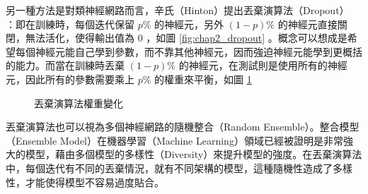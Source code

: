 另一種方法是對類神經網路而言，辛氏（Hinton）提出丟棄演算法（Dropout）~\cite{srivastava2014dropout} ：即在訓練時，每個迭代保留 $p\%$ 的神經元，另外 $(1-p)\%$ 的神經元直接關閉，無法活化，使得輸出值為 0 ，如圖 \ref{fig:chap2_dropout} 。概念可以想成是希望每個神經元能自己學到參數，而不靠其他神經元，因而強迫神經元能學到更概括的能力。而當在訓練時丟棄 $(1-p)\%$ 的神經元，在測試則是使用所有的神經元，因此所有的參數需要乘上 $p\%$ 的權重來平衡，如圖 \ref{fig:chap2_drop_w}

\begin{figure}[h]
    \centering
    \caption{丟棄演算法權重變化\cite{srivastava2014dropout}}\label{fig:chap2_drop_w}
\end{figure}

丟棄演算法也可以視為多個神經網路的隨機整合（Random Ensemble）。整合模型（Ensemble Model）在機器學習（Machine Learning）領域已經被證明是非常強大的模型，藉由多個模型的多樣性（Diversity）來提升模型的強度。在丟棄演算法中，每個迭代有不同的丟棄情況，就有不同架構的模型，這種隨機性造成了多樣性，才能使得模型不容易過度貼合。

